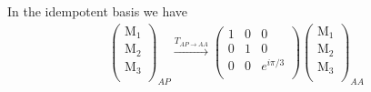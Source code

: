 \documentclass[12pt,a4paper]{article}
\newcounter{arrow}
\begin{document}
In the idempotent basis we have
\begin{align}
\left( \begin{matrix}
\text{M}_1\\
\text{M}_2\\
\text{M}_3\\
\end{matrix} \right)_{AP} 
\xrightarrow{T_{AP \rightarrow AA}} 
\left(\begin{matrix} 
1 & 0 &0 \\
0 & 1 & 0 \\
0 & 0 & e^{i \pi /3} \\
\end{matrix} \right)
\left( \begin{matrix}
\text{M}_1\\
\text{M}_2\\
\text{M}_3\\
\end{matrix} \right)_{AA}
\end{align}
\end{document}
